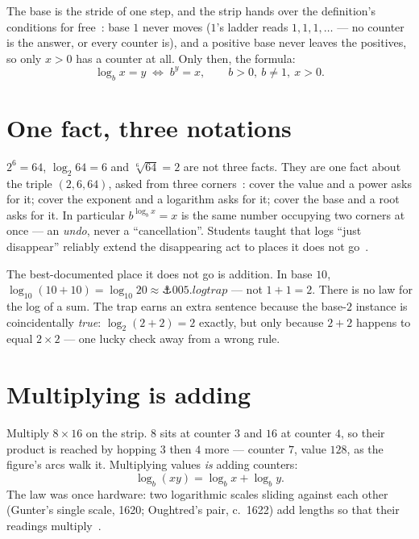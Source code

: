 \begin{narrative}
The base is the stride of one step, and the strip hands over the
definition's conditions for
free~\cite{algebra-openstax-college-algebra-2e-6-3-logarithmic-functions}:
base $1$ never moves ($1$'s ladder reads $1, 1, 1, \dots$ — no counter
is the answer, or every counter is), and a positive base never leaves
the positives, so only $x > 0$ has a counter at all. Only then, the
formula:
\[
  \log_b x = y \;\iff\; b^y = x,
  \qquad b > 0,\ b \neq 1,\ x > 0 .
\]

\section{One fact, three notations}

$2^6 = 64$, $\log_2 64 = 6$ and $\sqrt[6]{64} = 2$ are not three facts.
They are one fact about the triple $(2, 6, 64)$, asked from three
corners~\cite{algebra-3blue1brown-triangle-of-power}: cover the value
and a power asks for it; cover the exponent and a logarithm asks for
it; cover the base and a root asks for it. In particular
$b^{\log_b x} = x$ is the same number occupying two corners at once —
an \emph{undo}, never a ``cancellation''. Students taught that logs
``just disappear'' reliably extend the disappearing act to places it
does not go~\cite{algebra-kenney-kastberg-links-in-learning-logarithms}.

The best-documented place it does not go is addition. In base $10$,
$\log_{10}(10 + 10) = \log_{10} 20 \approx \anchor{005.logtrap}$ — not
$1 + 1 = 2$. There is no law for the log of a sum. The trap earns an
extra sentence because the base-$2$ instance is coincidentally
\emph{true}: $\log_2(2+2) = 2$ exactly, but only because $2 + 2$
happens to equal $2 \times 2$ — one lucky check away from a wrong
rule.

\section{Multiplying is adding}

Multiply $8 \times 16$ on the strip. $8$ sits at counter $3$ and $16$
at counter $4$, so their product is reached by hopping $3$ then $4$
more — counter $7$, value $128$, as the figure's arcs walk it.
Multiplying values \emph{is} adding counters:
\[
  \log_b(xy) = \log_b x + \log_b y .
\]
The law was once hardware: two logarithmic scales sliding against each
other (Gunter's single scale, 1620; Oughtred's pair, c.~1622) add
lengths so that their readings multiply~\cite{algebra-wikipedia-slide-rule}.


\end{narrative}
